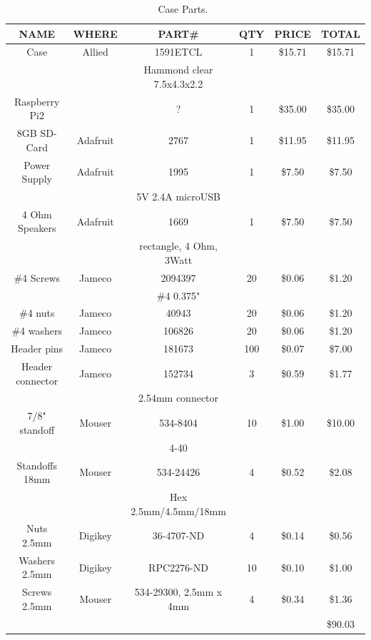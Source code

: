 \documentclass[11pt]{article}
\begin{document}
\begin{table}[tbp]

\caption{Case Parts.~\label{table:case_parts}}
\centering
\sf
\begin{tabular}{|c|c|c|c|c|c|}
\hline
NAME		& WHERE		& PART\#	           & QTY & PRICE    & TOTAL \\
\hline
\hline
Case		& Allied	& 1591ETCL		   & 1   & \$15.71   & \$15.71 \\
		&		& Hammond clear 7.5x4.3x2.2&     &           &         \\
\hline
Raspberry Pi2	&		&		?	   & 1   & \$35.00   & \$35.00 \\
\hline
8GB SD-Card	& Adafruit	& 2767			   & 1   & \$11.95   & \$11.95 \\
\hline
Power Supply	& Adafruit	& 1995			   & 1   & \$7.50    & \$7.50  \\
		&		& 5V 2.4A microUSB	   &     &           &         \\
\hline
4 Ohm Speakers	& Adafruit	& 1669			   & 1	 & \$7.50    & \$7.50  \\ 
		&		& rectangle, 4 Ohm, 3Watt  &     &           &         \\
\hline
\#4 Screws	& Jameco	& 2094397	  	   & 20  & \$0.06   & \$1.20  \\
		&		& \#4 0.375"		   &     &          &         \\
\hline
\#4 nuts	& Jameco	& 40943	   	           & 20  & \$0.06   & \$1.20  \\
\hline
\#4 washers	& Jameco	& 106826	   	   & 20  & \$0.06   & \$1.20  \\
\hline
Header pins	& Jameco	& 181673	           & 100 & \$0.07   & \$7.00  \\
\hline
Header connector& Jameco	& 152734	           & 3   & \$0.59   & \$1.77  \\
		&		& 2.54mm connector	   &     &          &         \\
\hline
7/8" standoff	& Mouser	& 534-8404		   & 10  & \$1.00   & \$10.00   \\
		&		& 4-40			   &     &          &          \\
\hline
Standoffs 18mm	& Mouser	& 534-24426		  & 4   &  \$0.52  &  \$2.08 \\
		&		& Hex 2.5mm/4.5mm/18mm	  &	&	   &	     \\\hline
Nuts   2.5mm	& Digikey	& 36-4707-ND		  & 4   &  \$0.14  & \$0.56 \\
\hline
Washers  2.5mm	& Digikey	& RPC2276-ND		  & 10   &  \$0.10  & \$1.00 \\
\hline
Screws 2.5mm	& Mouser	& 534-29300, 2.5mm x 4mm  & 4   &  \$0.34  &  \$1.36 \\
\hline

\hline
		&		&		&	&		& \$90.03 \\
\hline
\end{tabular}
\end{table}
\end{document}

